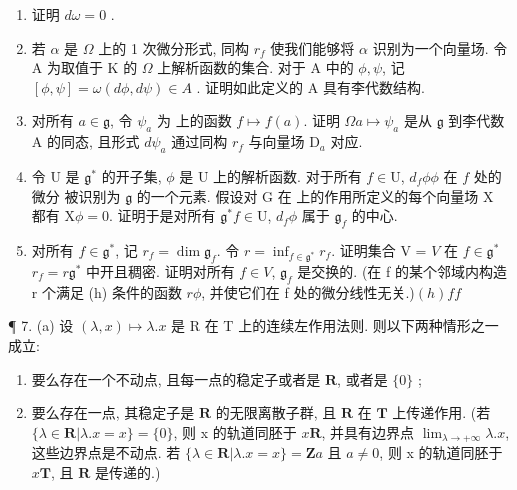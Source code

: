 \begin{enumerate}
\def\labelenumi{(\alph{enumi})}
\setcounter{enumi}{4}
\item
  证明 \(d\omega = 0\) .
\item
  若 \(\alpha\) 是 \(\Omega\) 上的 1 次微分形式, 同构 \(r_f\) 使我们能够将 \(\alpha\) 识别为一个向量场. 令 A 为取值于 K 的 \(\Omega\) 上解析函数的集合. 对于 A 中的 \(\phi, \psi\), 记 \([\phi, \psi] = \omega(d\phi, d\psi) \in A\) . 证明如此定义的 A 具有李代数结构.
\item
  对所有 \(a \in \mathfrak{g}\), 令 \(\psi_{a}\) 为  上的函数 \(f \mapsto f(a)\). 证明 \(\Omega\)\(a \mapsto \psi_{a}\) 是从 \(\mathfrak{g}\) 到李代数 A 的同态, 且形式 \(d\psi_{a}\) 通过同构 \(r_{f}\) 与向量场 \(\mathrm{D}_{a}\) 对应.
\item
  令 U 是 \(\mathfrak{g}^*\) 的开子集, \(\phi\) 是 U 上的解析函数. 对于所有 \(f\in \mathrm{U}\), \(d_{f}\phi\)\(\phi\) 在 \(f\) 处的微分  被识别为 \(\mathfrak{g}\) 的一个元素. 假设对 G 在  上的作用所定义的每个向量场 X 都有 \(\mathrm{X}\phi = 0\). 证明于是对所有 \(\mathfrak{g}^*\)\(f\in \mathrm{U}\), \(d_{f}\phi\) 属于 \(\mathfrak{g}_f\) 的中心.
\item
  对所有 \(f \in \mathfrak{g}^*\), 记 \(r_f = \dim \mathfrak{g}_f\). 令 \(r = \inf_{f \in \mathfrak{g}^*} r_f\). 证明集合 V = \(V\) 在 \(f \in \mathfrak{g}^*\)\(r_f = r\)\(\mathfrak{g}^*\) 中开且稠密. 证明对所有 \(f \in V\), \(\mathfrak{g}_f\) 是交换的. (在 f 的某个邻域内构造 r 个满足 (h) 条件的函数 \(r\)\(\phi\), 并使它们在 f 处的微分线性无关.)\((h)\)\(f\)\(f\)
\end{enumerate}

¶ 7. (a) 设 \((\lambda, x) \mapsto \lambda.x\) 是 R 在 T 上的连续左作用法则. 则以下两种情形之一成立:

\begin{enumerate}
\def\labelenumi{(\arabic{enumi})}
\item
  要么存在一个不动点, 且每一点的稳定子或者是 \(\mathbf{R}\), 或者是 \(\{0\}\) ;
\item
  要么存在一点, 其稳定子是 \(\mathbf{R}\) 的无限离散子群, 且 \(\mathbf{R}\) 在 \(\mathbf{T}\) 上传递作用. (若 \(\{\lambda \in \mathbf{R}|\lambda .x = x\} = \{0\}\), 则 x 的轨道同胚于 \(x\)\(\mathbf{R}\), 并具有边界点 \(\lim_{\lambda \to +\infty}\lambda .x\), 这些边界点是不动点. 若 \(\{\lambda \in \mathbf{R}|\lambda .x = x\} = \mathbf{Z}a\) 且 \(a\neq 0\), 则 x 的轨道同胚于 \(x\)\(\mathbf{T}\), 且 \(\mathbf{R}\) 是传递的.)
\end{enumerate}

